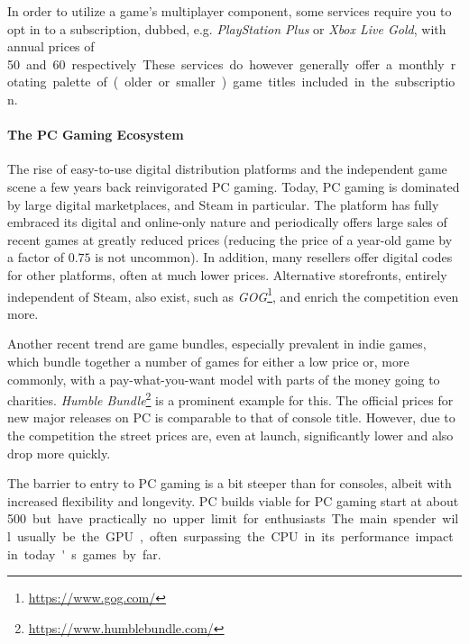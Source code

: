 In order to utilize a game's multiplayer component, some services require you to opt in to a subscription, dubbed, e.g. \textit{PlayStation Plus} or \textit{Xbox Live Gold}, with annual prices of \SI{50}[\EUR] and \SI{60}[\EUR] respectively. These services do however generally offer a monthly rotating palette of (older or smaller) game titles included in the subscription.




\paragraph{The PC Gaming Ecosystem}

The rise of easy-to-use digital distribution platforms and the independent game scene a few years back reinvigorated PC gaming. Today, PC gaming is dominated by large digital marketplaces, and Steam in particular. The platform has fully embraced its digital and online-only nature and periodically offers large sales of recent games at greatly reduced prices (reducing the price of a year-old game by a factor of $0.75$ is not uncommon). In addition, many resellers offer digital codes for other platforms, often at much lower prices. Alternative storefronts, entirely independent of Steam, also exist, such as \textit{GOG}\footnote{\url{https://www.gog.com/}}, and enrich the competition even more.

Another recent trend are game bundles, especially prevalent in indie games, which bundle together a number of games for either a low price or, more commonly, with a pay-what-you-want model with parts of the money going to charities. \textit{Humble Bundle}\footnote{\url{https://www.humblebundle.com/}} is a prominent example for this. The official prices for new major releases on PC is comparable to that of console title. However, due to the competition the street prices are, even at launch, significantly lower and also drop more quickly.

The barrier to entry to PC gaming is a bit steeper than for consoles, albeit with increased flexibility and longevity. PC builds viable for PC gaming start at about \SI{500}[\EUR] but have practically no upper limit for enthusiasts. The main spender will usually be the \gls{GPU}, often surpassing the \acrshort{CPU} in its performance impact in today's games by far.


